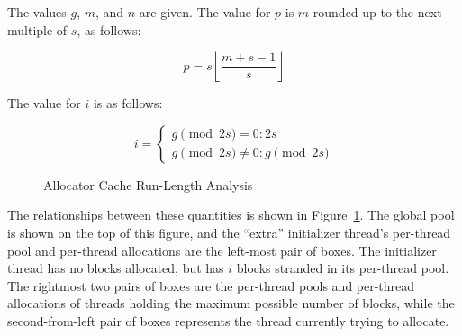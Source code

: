 	The values $g$, $m$, and $n$ are given.  The value for $p$ is
	$m$ rounded up to the next multiple of $s$, as follows:

	\begin{equation}
		p = s \left \lfloor \frac{m + s - 1}{s} \right \rfloor
	\label{sec:SMPdesign:p}
	\end{equation}

	The value for $i$ is as follows:

	\begin{equation}
		i = \left \{
			\begin{array}{l}
				g \pmod{2 s} = 0: 2 s \\
				g \pmod{2 s} \ne 0: g \pmod{2 s}
			\end{array}
		    \right .
	\label{sec:SMPdesign:i}
	\end{equation}

	\begin{figure}[tb]
	\begin{center}
	\end{center}
	\caption{Allocator Cache Run-Length Analysis}
	\label{fig:SMPdesign:Allocator Cache Run-Length Analysis}
	\end{figure}

	The relationships between these quantities is shown in
	Figure~\ref{fig:SMPdesign:Allocator Cache Run-Length Analysis}.
	The global pool is shown on the top of this figure, and
	the ``extra'' initializer thread's per-thread pool and
	per-thread allocations are the left-most pair of boxes.
	The initializer thread has no blocks allocated, but has
	$i$ blocks stranded in its per-thread pool.
	The rightmost two pairs of boxes are the per-thread pools and
	per-thread allocations of threads holding the maximum possible
	number of blocks, while the second-from-left pair of boxes
	represents the thread currently trying to allocate.

